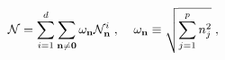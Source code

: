 \begin{equation}\label{caln}
{\cal N} = \sum_{i = 1}^d \sum_{{\bf n} \ne {\bf 0}} 
\omega_{{\bf n}} {\cal N}_{{\bf n}}^i \; , 
\; \; \; \; 
\omega_{{\bf n}} \equiv \sqrt{\sum_{j = 1}^p n_j^2} \; ,                       
\end{equation} 

